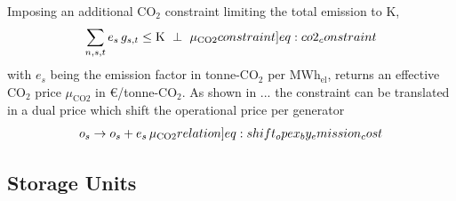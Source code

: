 \documentclass[11pt,twocolumn]{article}
\newcommand{\resultsin}[1]{\hspace{6pt} \bot  \hspace{6pt} #1}
\newcommand{\Forall}[1]{\hspace{10pt} \forall \,\, #1 }
\newcommand{\generation}{g_{s,t}}
\newcommand{\capacitygeneration}{G_{s}}
\newcommand{\operationalpricegeneration}{o_{s}}
\newcommand{\capitalpricegeneration}{c_{s}}
\newcommand{\lmp}[1][n]{\lambda_{#1,t}}
\newcommand{\emission}{e_{s}}
\newcommand{\emissionprice}{\mu_{\text{CO2}}}
\newcommand{\megawatthour}{MWh$_\text{el}$}
\begin{document}
Imposing an additional CO$_2$ constraint limiting the total emission to K,  
\begin{align}
\sum_{n,s,t} \emission \, \generation \le \text{K} \resultsin{\emissionprice} 
\label[constraint]{eq:co2_constraint}
\end{align}
with $\emission$ being the emission factor in tonne-CO$_2$ per \megawatthour, returns an effective CO$_2$ price $\emissionprice$ in \euro/tonne-CO$_2$. 
% 
As shown in ... the constraint can be translated in a dual price which shift the operational price per generator
\begin{align}
\operationalpricegeneration \rightarrow \operationalpricegeneration + \emission \, \emissionprice \label[relation]{eq:shift_opex_by_emission_cost}
\end{align}

\subsection{Storage Units}
\end{document}
